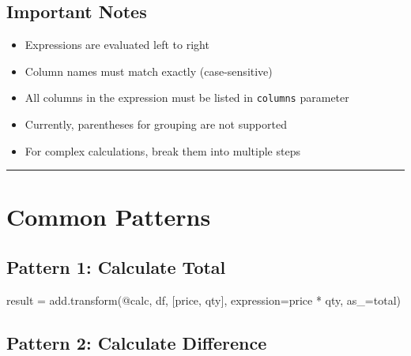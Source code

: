 \documentclass[
  letterpaper,
]{scrbook}
\newenvironment{Shaded}{\begin{snugshade}}{\end{snugshade}}
\newcommand{\NormalTok}[1]{\textcolor[rgb]{0.00,0.23,0.31}{#1}}
\newcommand{\OperatorTok}[1]{\textcolor[rgb]{0.37,0.37,0.37}{#1}}
\newcommand{\StringTok}[1]{\textcolor[rgb]{0.13,0.47,0.30}{#1}}
\providecommand{\tightlist}{%
  \setlength{\itemsep}{0pt}\setlength{\parskip}{0pt}}
\begin{document}
\subsection{Important Notes}\label{important-notes}

\begin{itemize}
\tightlist
\item
  Expressions are evaluated left to right
\item
  Column names must match exactly (case-sensitive)
\item
  All columns in the expression must be listed in \texttt{columns}
  parameter
\item
  Currently, parentheses for grouping are not supported
\item
  For complex calculations, break them into multiple steps
\end{itemize}

\begin{center}\rule{0.5\linewidth}{0.5pt}\end{center}

\section{Common Patterns}\label{common-patterns-1}

\subsection{Pattern 1: Calculate Total}\label{pattern-1-calculate-total}

\begin{Shaded}
\begin{Highlighting}[]
\NormalTok{result }\OperatorTok{=}\NormalTok{ add.transform(}\StringTok{\textquotesingle{}@calc\textquotesingle{}}\NormalTok{, df, [}\StringTok{\textquotesingle{}price\textquotesingle{}}\NormalTok{, }\StringTok{\textquotesingle{}qty\textquotesingle{}}\NormalTok{], }
\NormalTok{                       expression}\OperatorTok{=}\StringTok{\textquotesingle{}price * qty\textquotesingle{}}\NormalTok{, as\_}\OperatorTok{=}\StringTok{\textquotesingle{}total\textquotesingle{}}\NormalTok{)}
\end{Highlighting}
\end{Shaded}

\subsection{Pattern 2: Calculate
Difference}\label{pattern-2-calculate-difference}
\end{document}
